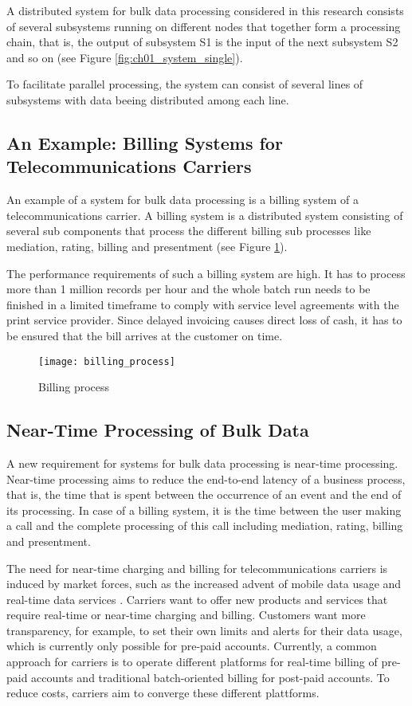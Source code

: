 A distributed system for bulk data processing considered in this research consists of several subsystems running on different nodes that together form a processing chain, that is, the output of subsystem S1 is the input of the next subsystem S2 and so on (see Figure \ref{fig:ch01_system_single}).

To facilitate parallel processing, the system can consist of several lines of subsystems with data beeing distributed among each line.

\subsection{An Example: Billing Systems for Telecommunications Carriers}
An example of a system for bulk data processing is a billing system of a telecommunications carrier. A billing system is a distributed system consisting of several sub components that process the different billing sub processes like mediation, rating, billing and presentment (see Figure \ref{fig:ch01_billing_process}).

The performance requirements of such a billing system are high. It has to process more than 1 million records per hour and the whole batch run needs to be finished in a limited timeframe to comply with service level agreements with the print service provider. Since delayed invoicing causes direct loss of cash, it has to be ensured that the bill arrives at the customer on time.

\begin{figure}[htbp]
	\centering
	\texttt{[image: billing\_process]}
	\caption{Billing process}
	\label{fig:ch01_billing_process}
\end{figure}

\subsection{Near-Time Processing of Bulk Data}
A new requirement for systems for bulk data processing is near-time processing. Near-time processing aims to reduce the end-to-end latency of a business process, that is, the time that is spent between the occurrence of an event and the end of its processing. In case of a billing system, it is the time between the user making a call and the complete processing of this call including mediation, rating, billing and presentment.

The need for near-time charging and billing for telecommunications carriers is induced by market forces, such as the increased advent of mobile data usage and real-time data services \citep{Cryderman:2011aa}. Carriers want to offer new products and services that require real-time or near-time charging and billing. Customers want more transparency, for example, to set their own limits and alerts for their data usage, which is currently only possible for pre-paid accounts. Currently, a common approach for carriers is to operate different platforms for real-time billing of pre-paid accounts and traditional batch-oriented billing for post-paid accounts. To reduce costs, carriers aim to converge these different plattforms.


